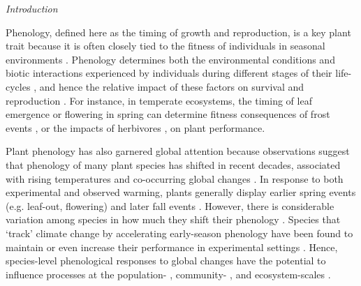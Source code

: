 \documentclass[11pt]{article}
\begin{document}
\emph{Introduction} 

Phenology, defined here as the timing of growth and reproduction, is a key plant trait because it is often closely tied to the fitness of individuals in seasonal environments \citep{verdu2005early,munguia2011meta}. Phenology determines both the environmental conditions and biotic interactions experienced by individuals during different stages of their life-cycles \citep{donohue2005niche}, and hence the relative impact of these factors on survival and reproduction \citep{caruso2019meta}. For instance, in temperate ecosystems, the timing of leaf emergence or flowering in spring can determine fitness consequences of frost events \citep{inouye2008effects,augspurger2013reconstructing}, or the impacts of herbivores \citep{meineke2021phenological}, on plant performance.

Plant phenology has also garnered global attention because observations suggest that phenology of many plant species has shifted in recent decades, associated with rising temperatures and co-occurring global changes \citep{wolkovich2012warming,parmesan2015plants,menzel2020climate}. In response to both experimental and observed warming, plants generally display earlier spring events (e.g. leaf-out, flowering) and later fall events \citep[e.g. senescence][]{Henry:1997lg,menzel2020climate}. However, there is considerable variation among species in how much they shift their phenology \citep[][sometimes termed `phenological sensitivity']{cook2012divergent,wolkovich2012warming,konig2018advances}. Species that `track' climate change by accelerating early-season phenology have been found to maintain or even increase their performance in experimental settings \citep{cleland2012phenological,wolkovich2021phenological}. Hence, species-level phenological responses to global changes have the potential to influence processes at the population- \citep{iler2021demographic}, community- \citep{cook2012divergent,caradonna2014shifts}, and ecosystem-scales \citep{piao2019plant}.
\end{document}
